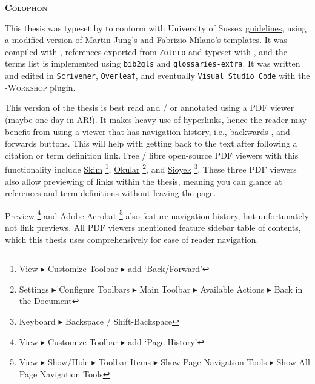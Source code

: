 {}

{}\label{sec: reading}
 \begin{flushleft}
	\Huge \textsc{\textbf{Colophon}}
	
\end{flushleft}
\begin{SingleSpace}
\noindent This thesis was typeset by  to conform with University of Sussex \href{https://www.sussex.ac.uk/rsao/examination}{guidelines}, using a \href{https://github.com/sambilbow/doctoral-thesis}{modified version} of \href{https://github.com/Martin-Jung/Sussex_PhDThesis}{Martin Jung's} and \href{https://github.com/fabriziomiano/phd_thesis}{Fabrizio Milano's} templates. It was compiled with , references exported from \verb|Zotero| and typeset with , and the terms list is implemented using \verb|bib2gls| and \verb|glossaries-extra|. It was written and edited in \verb|Scrivener|, \verb|Overleaf|, and eventually \verb|Visual Studio Code| with the -\scriptsize{\textsc{Workshop}} \normalsize plugin.

\noindent This version of the thesis is best read and / or annotated using a PDF viewer (maybe one day in AR!). It makes heavy use of hyperlinks, hence the reader may benefit from using a viewer that has navigation history, i.e., backwards \faArrowCircleLeft\space, and forwards \faArrowCircleRight\space buttons. This will help with getting back to the text after following a citation or term definition link. Free / libre open-source PDF viewers with this functionality include \href{https://sourceforge.net/projects/skim-app/}{Skim} \faApple\space \footnote{View $\blacktriangleright$ Customize Toolbar $\blacktriangleright$ add `Back/Forward'}, \href{https://okular.kde.org/en-gb/}{Okular} \faLinux \space \faWindows \space \footnote{Settings $\blacktriangleright$ Configure Toolbars  $\blacktriangleright$ Main Toolbar $\blacktriangleright$ Available Actions $\blacktriangleright$ Back in the Document}, and \href{https://sioyek.info/}{Sioyek} \faApple \space \faLinux \space \faWindows \space \footnote{Keyboard $\blacktriangleright$ Backspace / Shift-Backspace}. These three PDF viewers also allow previewing of links within the thesis, meaning you can glance at references and term definitions without leaving the page.

\noindent Preview \faApple\space \footnote{View $\blacktriangleright$ Customize Toolbar $\blacktriangleright$ add `Page History'} and Adobe Acrobat \faApple\space \faLinux \space \faWindows \space \footnote{View $\blacktriangleright$  Show/Hide $\blacktriangleright$ Toolbar Items $\blacktriangleright$ Show Page Navigation Tools $\blacktriangleright$ Show All Page Navigation Tools} also feature navigation history, but unfortunately not link previews. All PDF viewers mentioned feature sidebar table of contents, which this thesis uses comprehensively for ease of reader navigation.


\end{SingleSpace}
